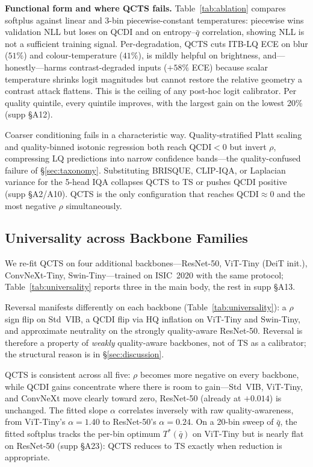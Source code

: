 \documentclass{bmvc2k}
\begin{document}
\textbf{Functional form and where QCTS fails.}
Table~\ref{tab:ablation} compares softplus against linear and 3-bin piecewise-constant temperatures: piecewise wins validation NLL but loses on QCDI and on entropy--$\bar q$ correlation, showing NLL is not a sufficient training signal. Per-degradation, QCTS cuts ITB-LQ ECE on blur ($51\%$) and colour-temperature ($41\%$), is mildly helpful on brightness, and---honestly---harms contrast-degraded inputs ($+58\%$ ECE) because scalar temperature shrinks logit magnitudes but cannot restore the relative geometry a contrast attack flattens. This is the ceiling of any post-hoc logit calibrator. Per quality quintile, every quintile improves, with the largest gain on the lowest 20\% (supp \S A12).



Coarser conditioning fails in a characteristic way. Quality-stratified Platt scaling and quality-binned isotonic regression both reach QCDI${<}0$ but invert $\rho$, compressing LQ predictions into narrow confidence bands---the quality-confused failure of \S\ref{sec:taxonomy}. Substituting BRISQUE, CLIP-IQA, or Laplacian variance for the 5-head IQA collapses QCTS to TS or pushes QCDI positive (supp \S A2/A10). QCTS is the only configuration that reaches QCDI${\approx}0$ and the most negative $\rho$ simultaneously.

\subsection{Universality across Backbone Families}
\label{sec:universality}

We re-fit QCTS on four additional backbones---ResNet-50, ViT-Tiny (DeiT init.), ConvNeXt-Tiny, Swin-Tiny---trained on ISIC~2020 with the same protocol; Table~\ref{tab:universality} reports three in the main body, the rest in supp \S A13.

Reversal manifests differently on each backbone (Table~\ref{tab:universality}): a $\rho$ sign flip on Std~VIB, a QCDI flip via HQ inflation on ViT-Tiny and Swin-Tiny, and approximate neutrality on the strongly quality-aware ResNet-50. Reversal is therefore a property of \emph{weakly} quality-aware backbones, not of TS as a calibrator; the structural reason is in \S\ref{sec:discussion}.

QCTS is consistent across all five: $\rho$ becomes more negative on every backbone, while QCDI gains concentrate where there is room to gain---Std~VIB, ViT-Tiny, and ConvNeXt move clearly toward zero, ResNet-50 (already at $+0.014$) is unchanged. The fitted slope $\alpha$ correlates inversely with raw quality-awareness, from ViT-Tiny's $\alpha{=}1.40$ to ResNet-50's $\alpha{=}0.24$. On a 20-bin sweep of $\bar q$, the fitted softplus tracks the per-bin optimum $T^*(\bar q)$ on ViT-Tiny but is nearly flat on ResNet-50 (supp \S A23): QCTS reduces to TS exactly when reduction is appropriate.
\end{document}
